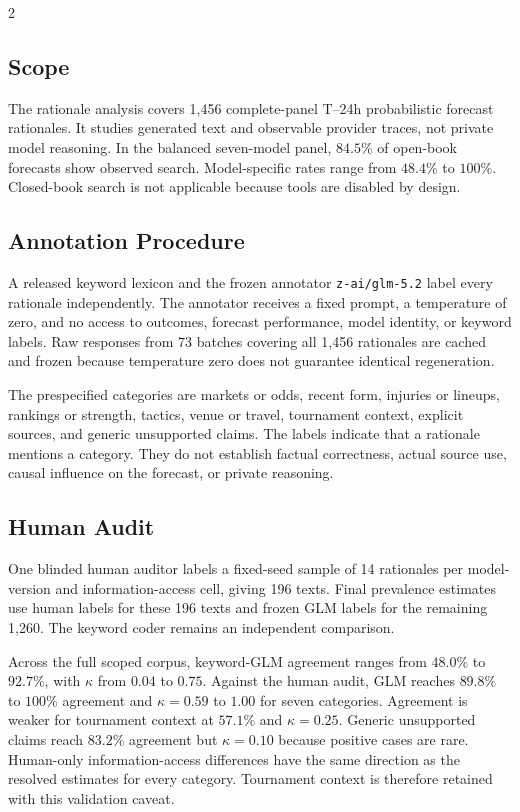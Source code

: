 \documentclass[sigconf,nonacm]{acmart}
\begin{document}
\begin{multicols}{2}
\subsection{Scope}

The rationale analysis covers 1,456 complete-panel T--24h probabilistic forecast rationales. It studies generated text and observable provider traces, not private model reasoning. In the balanced seven-model panel, $84.5\%$ of open-book forecasts show observed search. Model-specific rates range from $48.4\%$ to $100\%$. Closed-book search is not applicable because tools are disabled by design.

\subsection{Annotation Procedure}

A released keyword lexicon and the frozen annotator \texttt{z-ai/glm-5.2} label every rationale independently. The annotator receives a fixed prompt, a temperature of zero, and no access to outcomes, forecast performance, model identity, or keyword labels. Raw responses from 73 batches covering all 1,456 rationales are cached and frozen because temperature zero does not guarantee identical regeneration.

The prespecified categories are markets or odds, recent form, injuries or lineups, rankings or strength, tactics, venue or travel, tournament context, explicit sources, and generic unsupported claims. The labels indicate that a rationale mentions a category. They do not establish factual correctness, actual source use, causal influence on the forecast, or private reasoning.

\subsection{Human Audit}

One blinded human auditor labels a fixed-seed sample of 14 rationales per model-version and information-access cell, giving 196 texts. Final prevalence estimates use human labels for these 196 texts and frozen GLM labels for the remaining 1,260. The keyword coder remains an independent comparison.

Across the full scoped corpus, keyword-GLM agreement ranges from $48.0\%$ to $92.7\%$, with $\kappa$ from $0.04$ to $0.75$. Against the human audit, GLM reaches $89.8\%$ to $100\%$ agreement and $\kappa=0.59$ to $1.00$ for seven categories. Agreement is weaker for tournament context at $57.1\%$ and $\kappa=0.25$. Generic unsupported claims reach $83.2\%$ agreement but $\kappa=0.10$ because positive cases are rare. Human-only information-access differences have the same direction as the resolved estimates for every category. Tournament context is therefore retained with this validation caveat.


\end{multicols}
\end{document}
